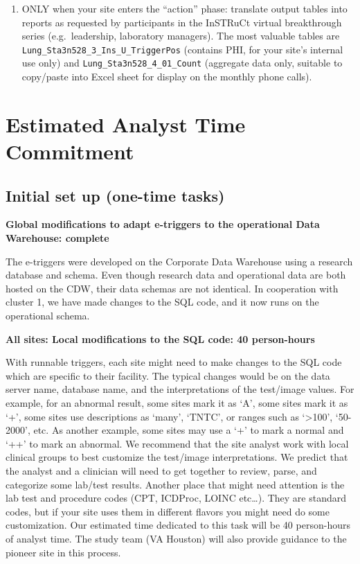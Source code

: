 \documentclass{article}
\begin{document}
\begin{enumerate}
\item ONLY when your site enters the ``action'' phase: translate
  output tables into reports as requested by participants in the
  InSTRuCt virtual breakthrough series (e.g.\ leadership, laboratory
  managers). The most valuable tables are
  \texttt{Lung\_Sta3n528\_3\_Ins\_U\_TriggerPos} (contains PHI, for your site's
  internal use only) and \texttt{Lung\_Sta3n528\_4\_01\_Count} (aggregate data
  only, suitable to copy/paste into Excel sheet for display on the
  monthly phone calls).

\end{enumerate}




\section{Estimated Analyst Time Commitment}

\subsection{Initial set up (one-time tasks)}

\textbf{Global modifications to adapt e-triggers to the operational
  Data Warehouse: complete}

The e-triggers were developed on the Corporate Data Warehouse using a
research database and schema. Even though research data and
operational data are both hosted on the CDW, their data schemas are
not identical. In cooperation with cluster 1, we have made changes to
the SQL code, and it now runs on the operational schema.

\noindent\textbf{All sites: Local modifications to the SQL code: 40
  person-hours}

With runnable triggers, each site might need to make changes to the
SQL code which are specific to their facility. The typical changes
would be on the data server name, database name, and the
interpretations of the test/image values. For example, for an abnormal
result, some sites mark it as `A', some sites mark it as `+', some
sites use descriptions as `many', `TNTC', or ranges such as
`\textgreater{}100', `50-2000', etc. As another example, some sites
may use a `+' to mark a normal and `++' to mark an abnormal. We
recommend that the site analyst work with local clinical groups to
best customize the test/image interpretations. We predict that the
analyst and a clinician will need to get together to review, parse,
and categorize some lab/test results. Another place that might need
attention is the lab test and procedure codes (CPT, ICDProc, LOINC
etc\ldots{}). They are standard codes, but if your site uses them in
different flavors you might need do some customization. Our estimated
time dedicated to this task will be 40 person-hours of analyst time.
The study team (VA Houston) will also provide guidance to the
pioneer site in this process.
\end{document}

